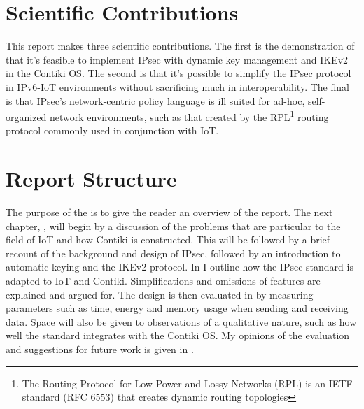 \documentclass[final,a4paper,twoside,11pt,onecolumn]{report}
\begin{document}

	

\section{Scientific Contributions}
This report makes three scientific contributions. The first is the demonstration of that it's feasible to implement IPsec with dynamic key management and IKEv2 in the Contiki OS. The second is that it's possible to simplify the IPsec protocol in IPv6-IoT environments without sacrificing much in interoperability. The final is that IPsec's network-centric policy language is ill suited for ad-hoc, self-organized network environments, such as that created by the RPL\footnote{The Routing Protocol for Low-Power and Lossy Networks (RPL) is an IETF standard (RFC 6553) that creates dynamic routing topologies} routing protocol commonly used in conjunction with IoT.

\section{Report Structure}
The purpose of the  is to give the reader an overview of the report. The next chapter, , will begin by a discussion of the problems that are particular to the field of IoT and how Contiki is constructed. This will be followed by a brief recount of the background and design of IPsec, followed by an introduction to automatic keying and the IKEv2 protocol. In  I outline how the IPsec standard is adapted to IoT and Contiki. Simplifications and omissions of features are explained and argued for. The design is then evaluated in  by measuring parameters such as time, energy and memory usage when sending and receiving data. Space will also be given to observations of a qualitative nature, such as how well the standard integrates with the Contiki OS. My opinions of the evaluation and suggestions for future work is given in .
\end{document}
